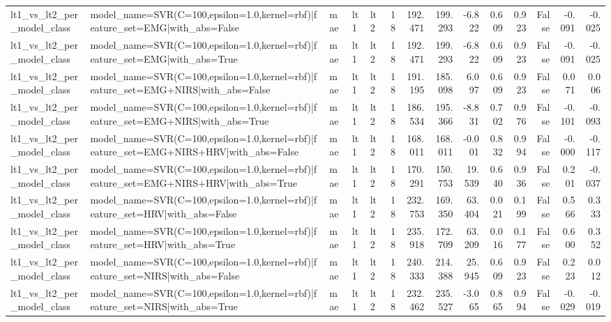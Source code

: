 \begin{table}
\begin{tabular}{lllllrrrrrrrrr}
lt1_vs_lt2_per_model_class & model_name=SVR(C=100,epsilon=1.0,kernel=rbf)|feature_set=EMG|with_abs=False & mae & lt1 & lt2 & 18 & 192.471 & 199.293 & -6.822 & 0.609 & 0.923 & False & -0.091 & -0.025 \\
lt1_vs_lt2_per_model_class & model_name=SVR(C=100,epsilon=1.0,kernel=rbf)|feature_set=EMG|with_abs=True & mae & lt1 & lt2 & 18 & 192.471 & 199.293 & -6.822 & 0.609 & 0.923 & False & -0.091 & -0.025 \\
lt1_vs_lt2_per_model_class & model_name=SVR(C=100,epsilon=1.0,kernel=rbf)|feature_set=EMG+NIRS|with_abs=False & mae & lt1 & lt2 & 18 & 191.195 & 185.098 & 6.097 & 0.609 & 0.923 & False & 0.071 & 0.006 \\
lt1_vs_lt2_per_model_class & model_name=SVR(C=100,epsilon=1.0,kernel=rbf)|feature_set=EMG+NIRS|with_abs=True & mae & lt1 & lt2 & 18 & 186.534 & 195.366 & -8.831 & 0.702 & 0.976 & False & -0.101 & -0.093 \\
lt1_vs_lt2_per_model_class & model_name=SVR(C=100,epsilon=1.0,kernel=rbf)|feature_set=EMG+NIRS+HRV|with_abs=False & mae & lt1 & lt2 & 18 & 168.011 & 168.011 & -0.001 & 0.832 & 0.994 & False & -0.000 & -0.117 \\
lt1_vs_lt2_per_model_class & model_name=SVR(C=100,epsilon=1.0,kernel=rbf)|feature_set=EMG+NIRS+HRV|with_abs=True & mae & lt1 & lt2 & 18 & 170.291 & 150.753 & 19.539 & 0.640 & 0.936 & False & 0.201 & -0.037 \\
lt1_vs_lt2_per_model_class & model_name=SVR(C=100,epsilon=1.0,kernel=rbf)|feature_set=HRV|with_abs=False & mae & lt1 & lt2 & 18 & 232.753 & 169.350 & 63.404 & 0.021 & 0.199 & False & 0.566 & 0.333 \\
lt1_vs_lt2_per_model_class & model_name=SVR(C=100,epsilon=1.0,kernel=rbf)|feature_set=HRV|with_abs=True & mae & lt1 & lt2 & 18 & 235.918 & 172.709 & 63.209 & 0.016 & 0.177 & False & 0.600 & 0.352 \\
lt1_vs_lt2_per_model_class & model_name=SVR(C=100,epsilon=1.0,kernel=rbf)|feature_set=NIRS|with_abs=False & mae & lt1 & lt2 & 18 & 240.333 & 214.388 & 25.945 & 0.609 & 0.923 & False & 0.223 & 0.012 \\
lt1_vs_lt2_per_model_class & model_name=SVR(C=100,epsilon=1.0,kernel=rbf)|feature_set=NIRS|with_abs=True & mae & lt1 & lt2 & 18 & 232.462 & 235.527 & -3.065 & 0.865 & 0.994 & False & -0.029 & -0.019 \\
\bottomrule
\end{tabular}
\end{table}

